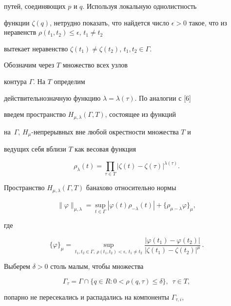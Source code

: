 путей, соединяющих $p$ и $q$. Используя локальную однолистность


функции $\zeta(q)$, нетрудно показать, что найдется число $\epsilon


>0$ такое, что из неравенств $\rho(t_1,t_2)\le\epsilon$, $t_1\ne t_2$


вытекает неравенство $\zeta(t_1)\ne\zeta(t_2)$, $t_1,t_2\in\Gamma$.





Обозначим через $T$ множество всех узлов


контура $\Gamma$. На $T$ определим


действительнозначную функцию $\lambda=\lambda(\tau)$. По аналогии с [6]


введем пространство $H_{\mu,\lambda}(\Gamma,T)$, состоящее из функций


на~$\Gamma$, $H_\mu$-непрерывных вне любой окрестности множества $T$ и


ведущих себя вблизи $T$ как весовая функция


$$


\rho_\lambda (t)=\prod_{\tau\in T}|\zeta (t)-\zeta(\tau)|^{\lambda(\tau)}.


$$


Пространство $H_{\mu,\lambda}(\Gamma, T)$ банахово относительно нормы


$$


\|\varphi \|_{\mu,\lambda}=


\sup_{t\in \Gamma}|\varphi (t)\rho_{-\lambda}(t)|+


\{\rho_{\mu -\lambda}\varphi\}_\mu,


$$


где


$$


\{\varphi\}_{\mu}=


\sup_{t_1,t_2\in\Gamma, \ \rho (t_1, t_2)<\epsilon,\ t_1 \ne t_2}


\frac{|\varphi (t_1)-\varphi (t_2)|}


{|\zeta (t_1)-\zeta (t_2)|^\mu}\,.


$$


Выберем $\delta>0$ столь малым, чтобы множества


$$


\Gamma_\tau =\Gamma\cap\{q\in R: 0<\rho (q, \tau)\le\delta\},


\ \; \tau\in T,$$


попарно не пересекались и распадались на компоненты $\Gamma_{\tau, i}$,


